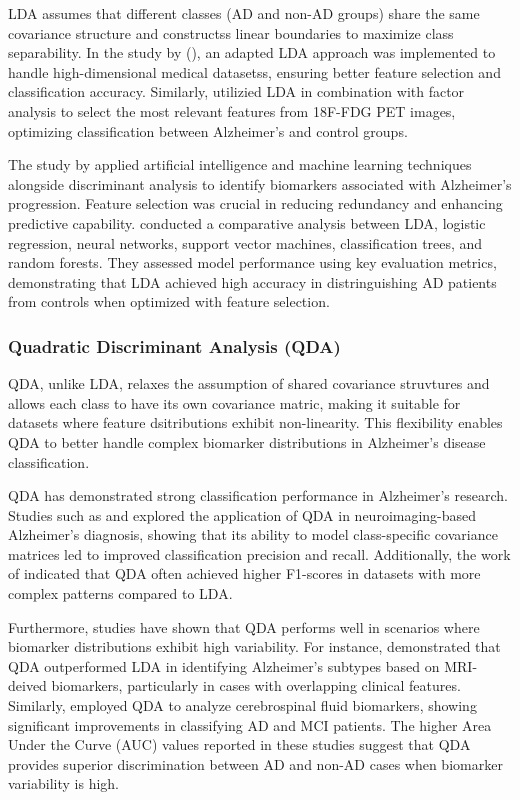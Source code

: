 \documentclass[12pt]{article}
\begin{document}
LDA assumes that different classes (AD and non-AD groups) share the same covariance structure and constructss linear boundaries to maximize class separability. In the study by (\cite{le2020_lda_highdimensional}), an adapted LDA approach was implemented to handle high-dimensional medical datasetss, ensuring better feature selection and
classification accuracy. Similarly, \cite{salasgonzalez2010_factor_analysis_lda} utilizied LDA in combination with factor analysis to select the most relevant features from 18F-FDG PET images, optimizing classification between Alzheimer's and control groups.

The study by \cite{yilmaz2021_metabolic_biomarkers_ad} applied artificial intelligence and machine learning techniques alongside discriminant analysis to identify biomarkers associated with Alzheimer's progression. Feature selection was crucial in reducing redundancy and enhancing predictive capability. \cite{maroco2011_data_mining_dementia}
conducted a comparative analysis between LDA, logistic regression, neural networks, support vector machines, classification trees, and random forests. They assessed model performance using key evaluation metrics, demonstrating that LDA achieved high accuracy in distringuishing AD patients from controls when optimized with feature selection.

\subsubsection{Quadratic Discriminant Analysis (QDA)}
\noindent

QDA, unlike LDA, relaxes the assumption of shared covariance struvtures and allows each class to have its own covariance matric, making it suitable for datasets where feature dsitributions exhibit non-linearity. This flexibility enables QDA to better handle complex biomarker distributions in Alzheimer's disease classification.

QDA has demonstrated strong classification performance in Alzheimer's research. Studies such as \cite{zhang2017_qda_neuroimaging} and \cite{pereira2020_qda_mri} explored the application of QDA in neuroimaging-based Alzheimer's diagnosis, showing that its ability to model class-specific covariance matrices led to improved classification precision
and recall. Additionally, the work of \cite{maroco2011_data_mining_dementia} indicated that QDA often achieved higher F1-scores in datasets with more complex patterns compared to LDA.

Furthermore, studies have shown that QDA performs well in scenarios where biomarker distributions exhibit high variability. For instance, \cite{lee2015_qda_mri_biomarker} demonstrated that QDA outperformed LDA in identifying Alzheimer's subtypes based on MRI-deived biomarkers, particularly in cases with overlapping clinical features. Similarly, 
\cite{garciarodriguez2016_qda_csf} employed QDA to analyze cerebrospinal fluid biomarkers, showing significant improvements in classifying AD and MCI patients. The higher Area Under the Curve (AUC) values reported in these studies suggest that QDA provides superior discrimination between AD and non-AD cases when biomarker variability is high.
\end{document}
